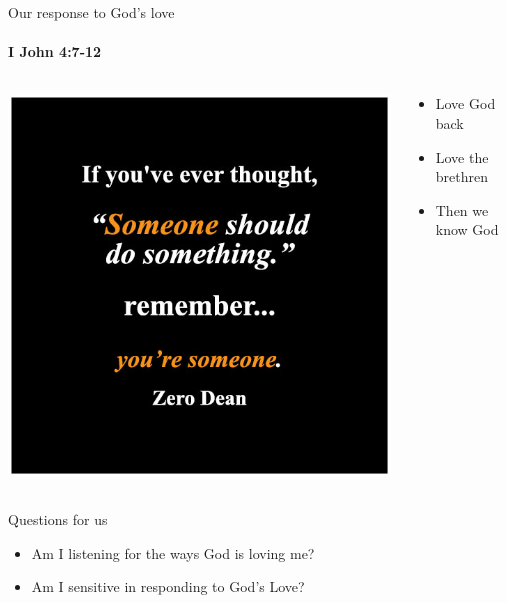 \begin{frame}{Our response to God's love}
\framesubtitle{I John 4:7-12}
\begin{columns}[c]
\begin{column}{0.5\textwidth}
	\includegraphics[width=\columnwidth]{figures/doSomething.jpg}
\end{column}
\begin{column}{0.5\textwidth}
	\begin{itemize}
    \item Love God back
    \item Love the brethren
    \item Then we know God
	\end{itemize}
\end{column}
\end{columns}

\end{frame}

\begin{frame}{Questions for us}
	\centering
	\begin{itemize}
    \item Am I listening for the ways God is loving me?
    \item Am I sensitive in responding to God's Love?
	\end{itemize}
\end{frame}
